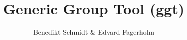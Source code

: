 

\renewcommand{\ocwmodule}[1]{\newpage \section{Module #1}}
\renewcommand{\ocwyaccmodule}[1]{\newpage \section{Module #1 (Yacc)}}
\renewcommand{\ocwlexmodule}[1]{\newpage \section{Module #1 (Lex)}}

\renewcommand{\ocwinterface}[1]{\newpage \section{Interface #1}}

\newcommand{\ic}[1]{\vspace{-1.75em}\begin{leftbar}\noindent #1\end{leftbar}\vspace{-0.75em}}


\title{Generic Group Tool (ggt)}
\author{Benedikt Schmidt \& Edvard Fagerholm}

\maketitle
 
\tableofcontents
\newpage

